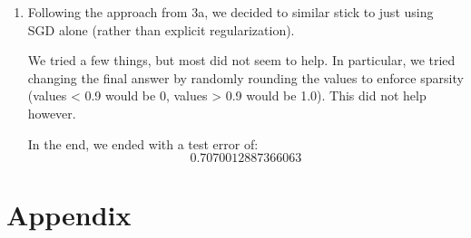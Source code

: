 \documentclass[12pt]{article}
\begin{document}
\begin{enumerate}[label=(\alph*)]
  \item
    Following the approach from 3a, we decided to similar stick to just using SGD alone (rather than explicit regularization).

    We tried a few things, but most did not seem to help. In particular, we tried changing the final answer by randomly rounding the values to enforce sparsity (values < 0.9 would be 0, values > 0.9 would be 1.0). This did not help however. 

    In the end, we ended with a test error of:
    \[
      0.7070012887366063
    \]

\end{enumerate}


\newpage
\section*{Appendix}

\end{document}
